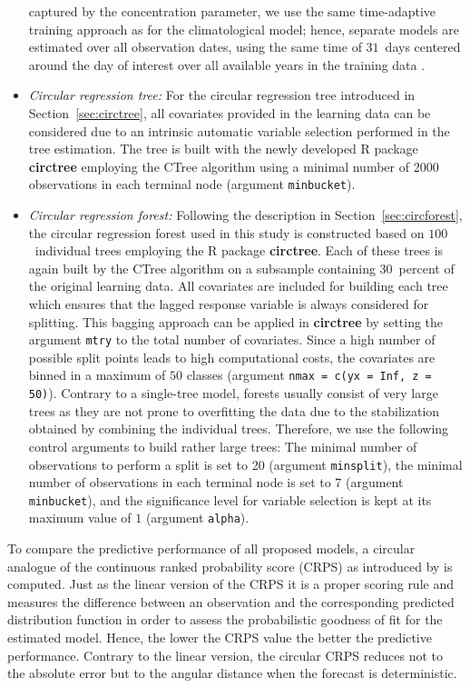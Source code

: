 \documentclass{statsoc}
\begin{document}
\begin{itemize}
    captured by the concentration parameter, we use the same time-adaptive
    training approach as for the climatological model; hence, separate models are
    estimated over all observation dates, using the same time of $31$~days
    centered around the day of interest over all available years in the training
    data \citep{Lang+Lerch+Mayr:2019}.
  \item \emph{Circular regression tree:}
    For the circular regression tree introduced in Section~\ref{sec:circtree},
    all covariates provided in the learning data can be considered due to an
    intrinsic automatic variable selection performed in the tree estimation. The
    tree is built with the newly developed \textsf{R} package \textbf{circtree} employing the
    CTree algorithm \citep{Hothorn+Hornik+Zeileis:2006} using a minimal number of
    2000 observations in each terminal node (argument \texttt{minbucket}).
  \item \emph{Circular regression forest:} Following the description in
    Section~\ref{sec:circforest}, the circular regression forest used in this study is
    constructed based on $100$~individual trees employing the \textsf{R} package
    \textbf{circtree}. Each of these trees is again built by the CTree algorithm on a
    subsample containing $30$~percent of the original learning data. All
    covariates are included for building each tree which ensures that the lagged
    response variable is always considered for splitting. This bagging approach can
    be applied in \textbf{circtree} by setting the argument \texttt{mtry} to the total
    number of covariates. Since a high number of possible split points leads to
    high computational costs, the covariates are binned in a maximum of $50$
    classes (argument \texttt{nmax = c(yx = Inf, z = 50)}). Contrary to a
    single-tree model, forests usually consist of very large trees as they are not
    prone to overfitting the data due to the stabilization obtained by combining
    the individual trees. Therefore, we use the following control arguments to
    build rather large trees: The minimal number of observations to perform a split
    is set to 20 (argument \texttt{minsplit}), the minimal number of observations
    in each terminal node is set to 7 (argument \texttt{minbucket}), and the
    significance level for variable selection is kept at its maximum value of $1$
    (argument \texttt{alpha}).
\end{itemize}

To compare the predictive performance of all proposed models, a circular
analogue of the continuous ranked probability score (CRPS) as introduced by
\cite{Grimit+Gneiting+Berrocal:2006} is computed. Just as the linear version of
the CRPS \citep[for more details see][]{Hersbach:2000} it is a proper scoring
rule \citep{Gneiting+Raftery:2007} and measures the difference between an
observation and the corresponding predicted distribution function in order to
assess the probabilistic goodness of fit for the estimated model. Hence, the
lower the CRPS value the better the predictive performance. Contrary to the
linear version, the circular CRPS reduces not to the absolute error but to the
angular distance when the forecast is deterministic.
\end{document}

